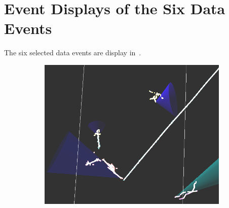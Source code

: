 \section{Event Displays of the Six Data Events}
\label{app:evd_data}

The six selected data events are display in~.

\begin{figure}[htbp]
\begin{center}
\begin{subfigure}{0.45\textwidth}
\includegraphics[width=0.95\linewidth]{figs/datapi0/evd/Run6070Subrun113Evt5680.png}
\caption{}
\end{subfigure}
\begin{subfigure}{0.45\textwidth}

\end{subfigure}
\end{center}
\end{figure}
